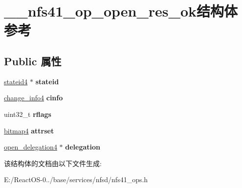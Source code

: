 \hypertarget{struct____nfs41__op__open__res__ok}{}\section{\+\_\+\+\_\+nfs41\+\_\+op\+\_\+open\+\_\+res\+\_\+ok结构体 参考}
\label{struct____nfs41__op__open__res__ok}
\subsection*{Public 属性}
\begin{DoxyCompactItemize}
\item 
\mbox{\label{struct____nfs41__op__open__res__ok_a6969be57f2ed199721b5cb9a285acc80}} 
\hyperlink{struct____stateid4}{stateid4} $\ast$ {\bfseries stateid}
\item 
\mbox{\label{struct____nfs41__op__open__res__ok_aa8ca04da200fe8644cdb982f54f3f90a}} 
\hyperlink{struct____change__info4}{change\+\_\+info4} {\bfseries cinfo}
\item 
\mbox{\label{struct____nfs41__op__open__res__ok_a8801c8af8400ff903f2f8b43b3772b21}} 
uint32\+\_\+t {\bfseries rflags}
\item 
\mbox{\label{struct____nfs41__op__open__res__ok_a00f8869b1905a538798f3b2c24cfa531}} 
\hyperlink{struct____bitmap4}{bitmap4} {\bfseries attrset}
\item 
\mbox{\label{struct____nfs41__op__open__res__ok_af09d01f0db5f7d995cf503032a6707c9}} 
\hyperlink{struct____open__delegation4}{open\+\_\+delegation4} $\ast$ {\bfseries delegation}
\end{DoxyCompactItemize}


该结构体的文档由以下文件生成\+:\begin{DoxyCompactItemize}
\item 
E\+:/\+React\+O\+S-\/0../base/services/nfsd/nfs41\+\_\+ops.\+h\end{DoxyCompactItemize}
